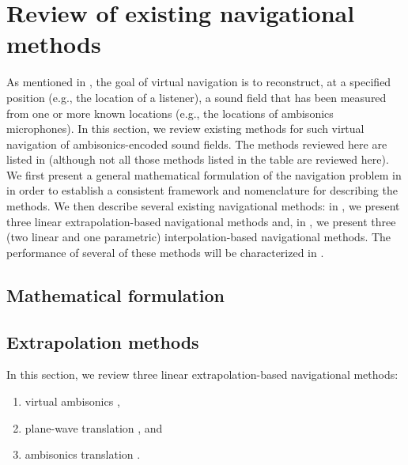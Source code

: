 \chapter{Review of existing navigational methods}\label{chap:03_Navigation_Techniques}
As mentioned in , the goal of virtual navigation is to reconstruct, at a specified position (e.g., the location of a listener), a sound field that has been measured from one or more known locations (e.g., the locations of ambisonics microphones).
In this section, we review existing methods for such virtual navigation of ambisonics-encoded sound fields.
The methods reviewed here are listed in  (although not all those methods listed in the table are reviewed here).
We first present a general mathematical formulation of the navigation problem in  in order to establish a consistent framework and nomenclature for describing the methods.
We then describe several existing navigational methods: in , we present three linear extrapolation-based navigational methods and, in , we present three (two linear and one parametric) interpolation-based navigational methods.
The performance of several of these methods will be characterized in .

\section{Mathematical formulation}\label{sec:03_Navigation_Techniques:Problem_Formulation}


\section{Extrapolation methods}\label{sec:03_Navigation_Techniques:Extrapolation_Methods}
In this section, we review three linear extrapolation-based navigational methods:
\begin{enumerate}
\item virtual ambisonics \citep[section 3.1]{TylkaChoueiri2015},
\item plane-wave translation \citep{SchultzSpors2013}, and
\item ambisonics translation \citep{GumerovDuraiswami2005,MenziesAlAkaidi2007a,Zotter2009PhD}.
\end{enumerate}

